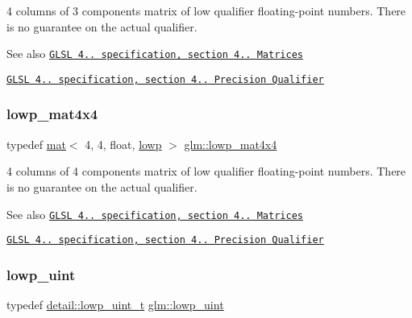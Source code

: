 4 columns of 3 components matrix of low qualifier floating-\/point numbers. There is no guarantee on the actual qualifier.

\begin{DoxySeeAlso}{See also}
\href{http://www.opengl.org/registry/doc/GLSLangSpec.4.20.8.pdf}{\tt G\+L\+SL 4.. specification, section 4.. Matrices} 

\href{http://www.opengl.org/registry/doc/GLSLangSpec.4.20.8.pdf}{\tt G\+L\+SL 4.. specification, section 4.. Precision Qualifier} 
\end{DoxySeeAlso}
\mbox{\label{group__core__precision_gaf8957db9f94a9c01a63db849da81bea0}} 
\subsubsection{\texorpdfstring{lowp\+\_\+mat4x4}{lowp\_mat4x4}}
{\footnotesize\ttfamily typedef \mbox{\hyperlink{structglm_1_1mat}{mat}}$<$ 4, 4, float, \mbox{\hyperlink{namespaceglm_a36ed105b07c7746804d7fdc7cc90ff25ae161af3fc695e696ce3bf69f7332bc2d}{lowp}} $>$ \mbox{\hyperlink{group__core__precision_gaf8957db9f94a9c01a63db849da81bea0}{glm\+::lowp\+\_\+mat4x4}}}

4 columns of 4 components matrix of low qualifier floating-\/point numbers. There is no guarantee on the actual qualifier.

\begin{DoxySeeAlso}{See also}
\href{http://www.opengl.org/registry/doc/GLSLangSpec.4.20.8.pdf}{\tt G\+L\+SL 4.. specification, section 4.. Matrices} 

\href{http://www.opengl.org/registry/doc/GLSLangSpec.4.20.8.pdf}{\tt G\+L\+SL 4.. specification, section 4.. Precision Qualifier} 
\end{DoxySeeAlso}
\mbox{\label{group__core__precision_ga8077c90f2c87e419ea6c273157dcc1fc}} 
\subsubsection{\texorpdfstring{lowp\+\_\+uint}{lowp\_uint}}
{\footnotesize\ttfamily typedef \mbox{\hyperlink{namespaceglm_1_1detail_ad59c4581ad8ce0c3ef6146edaa7e15dc}{detail\+::lowp\+\_\+uint\+\_\+t}} \mbox{\hyperlink{group__core__precision_ga8077c90f2c87e419ea6c273157dcc1fc}{glm\+::lowp\+\_\+uint}}}

